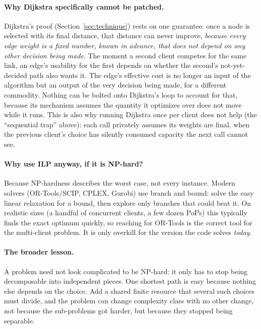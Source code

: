 \documentclass[11pt,a4paper]{article}
\begin{document}
\paragraph{Why Dijkstra specifically cannot be patched.}
Dijkstra's proof (Section~\ref{sec:technique}) rests on one guarantee: once a node is selected with its final distance, that distance can never
improve, \emph{because every edge weight is a fixed number, known in advance, that does not depend on any other decision being made}. The moment a
second client competes for the same link, an edge's usability for the first depends on whether the second's not-yet-decided path also wants
it. The edge's effective cost is no longer an input of the algorithm but an output of the very decision being made, for a different commodity.
Nothing can be bolted onto Dijkstra's loop to account for that, because its mechanism assumes the quantity it optimizes over does not move
while it runs. This is also why running Dijkstra once per client does not help (the ``sequential trap'' above): each call privately assumes
its weights are final, when the previous client's choice has silently consumed capacity the next call cannot see.

\paragraph{Why use ILP anyway, if it is NP-hard?}
Because NP-hardness describes the worst case, not every instance. Modern solvers (OR-Tools/SCIP, CPLEX, Gurobi) use branch and bound:
solve the easy linear relaxation for a bound, then explore only branches that could beat it. On realistic sizes (a handful of
concurrent clients, a few dozen PoPs) this typically finds the exact optimum quickly, so reaching for OR-Tools is the correct tool for the multi-client
problem. It is only overkill for the version the code solves \emph{today}.

\paragraph{The broader lesson.}
A problem need not look complicated to be NP-hard: it only has to stop being decomposable into independent pieces. One shortest path is
easy because nothing else depends on the choice. Add a shared finite resource that several such choices must divide, and the problem can change
complexity class with no other change, not because the sub-problems got harder, but because they stopped being separable.
\end{document}
